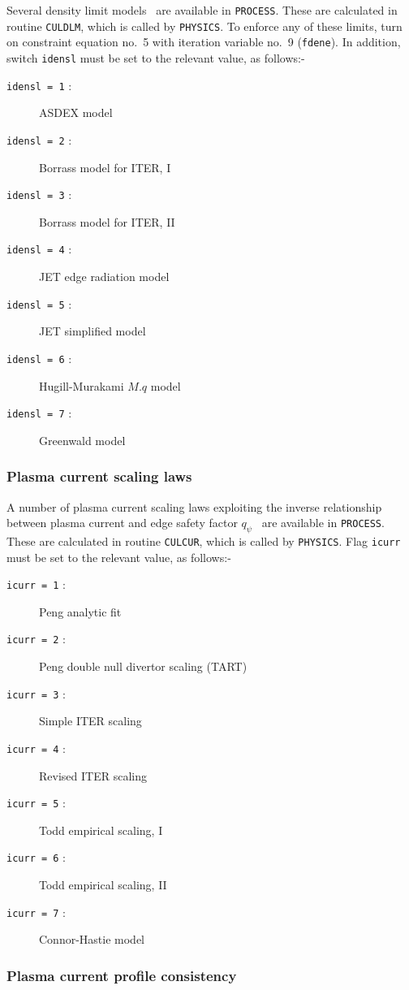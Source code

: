 \documentclass[11pt,a4paper]{report}
\newcommand{\process}{\mbox{\texttt{PROCESS}}}
\begin{document}
Several density limit models~\cite{172} are available in \process. These are
calculated in routine \texttt{CULDLM}, which is called by \texttt{PHYSICS}.
To enforce any of these limits, turn on constraint equation no.~5 with
iteration variable no.~9 (\texttt{fdene}).  In addition, switch
\texttt{idensl} must be set to the relevant value, as follows:-
\begin{description}
\item [\texttt{idensl = 1} :] ASDEX model
\item [\texttt{idensl = 2} :] Borrass model for ITER, I
\item [\texttt{idensl = 3} :] Borrass model for ITER, II
\item [\texttt{idensl = 4} :] JET edge radiation model
\item [\texttt{idensl = 5} :] JET simplified model
\item [\texttt{idensl = 6} :] Hugill-Murakami $M.q$ model
\item [\texttt{idensl = 7} :] Greenwald model
\end{description}

\subsubsection{Plasma current scaling laws}
\label{sec:current_scaling}

A number of plasma current scaling laws exploiting the inverse relationship
between plasma current and edge safety factor $q_{\psi}$~\cite{172} are
available in \process. These are calculated in routine \texttt{CULCUR}, which
is called by \texttt{PHYSICS}.  Flag \texttt{icurr} must be set to the
relevant value, as follows:-
\begin{description}
\item [\texttt{icurr = 1} :] Peng analytic fit
\item [\texttt{icurr = 2} :] Peng double null divertor scaling (TART)
\item [\texttt{icurr = 3} :] Simple ITER scaling
\item [\texttt{icurr = 4} :] Revised ITER scaling~\cite{Uckan88}
\item [\texttt{icurr = 5} :] Todd empirical scaling, I
\item [\texttt{icurr = 6} :] Todd empirical scaling, II
\item [\texttt{icurr = 7} :] Connor-Hastie model
\end{description}

\subsubsection{Plasma current profile consistency}
\label{sec:current_profile}
\end{document}
